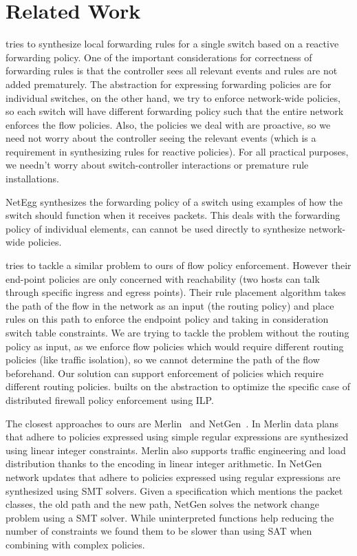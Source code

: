 \section{Related Work}
\cite{decentralize} tries to synthesize local forwarding rules for a single switch based on a reactive forwarding policy. One of the important considerations for correctness of forwarding rules is that the controller sees all relevant events and rules are not added prematurely. The abstraction for expressing forwarding policies are for individual switches, on the other hand, we try to enforce network-wide policies, so each switch will have different forwarding policy such that the entire network enforces the flow policies. Also, the policies we deal with are proactive, so we need not worry about the controller seeing the relevant events (which is a requirement in synthesizing rules for reactive policies). For all practical purposes, we needn't worry about switch-controller interactions or premature rule installations. 

NetEgg \cite{netegg} synthesizes the forwarding policy of a switch using examples of how the switch should function when it receives packets. This deals with the forwarding policy of individual elements, can cannot be used directly to synthesize network-wide policies. 

\cite{oneswitch} tries to tackle a similar problem to ours of flow policy enforcement. However their end-point policies are only concerned with reachability (two hosts can talk through specific ingress and egress points). Their rule placement algorithm takes the path of the flow in the network as an input (the routing policy) and place rules on this path to enforce the endpoint policy and taking in consideration switch table constraints. We are trying to tackle the problem without the routing policy as input, as we enforce flow policies which would require different routing policies (like traffic isolation), so we cannot determine the path of the flow beforehand. Our solution can support enforcement of policies which require different routing policies. \cite{distfirewall} builts on the \cite{oneswitch} abstraction to optimize the specific case of distributed firewall policy enforcement using ILP.  

The closest approaches to ours are Merlin~\cite{merlin} and NetGen~\cite{netgen}.
In Merlin data plans that adhere to policies expressed using simple regular expressions are synthesized using linear integer constraints. 
Merlin also supports traffic engineering and load distribution thanks to the encoding in linear integer arithmetic. 
In NetGen network updates that adhere to policies expressed using regular expressions are synthesized using SMT solvers. 
Given a specification which mentions the packet classes, the old path and the new path, NetGen solves the network change problem using a SMT solver. 
While uninterpreted functions help reducing the number of constraints we found them to be slower than using SAT when combining with complex policies. 

